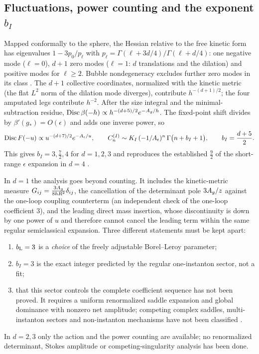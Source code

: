\subsection{\texorpdfstring{Fluctuations, power counting and the exponent $b_I$}{Fluctuations, power counting and the exponent b\_I}}
Mapped conformally to the sphere, the Hessian relative to the free kinetic form has
eigenvalues $1-3p_0/p_\ell$ with $p_\ell=\Gamma(\ell+3d/4)/\Gamma(\ell+d/4)$: one
negative mode ($\ell=0$), $d+1$ zero modes ($\ell=1$: $d$ translations and the dilation)
and positive modes for $\ell\ge2$. Bubble nondegeneracy excludes further zero modes in
its class \cite{rs:Davila2013}. The $d+1$ collective coordinates, normalized with the
kinetic metric (the flat $L^2$ norm of the dilation mode diverges), contribute
$h^{-(d+1)/2}$; the four amputated legs contribute $h^{-2}$. After the size integral and
the minimal-subtraction residue, $\operatorname{Disc}\beta(-h)\propto h^{-(d+5)/2}e^{-A_g/h}$. The
fixed-point shift divides by $\beta'(g_*)=O(\epsilon)$ and adds one inverse power, so
\begin{equation}
 \operatorname{Disc} F(-u)\propto u^{-(d+7)/2}e^{-A_\epsilon/u},\qquad
 C_n^{(I)}\sim K_I\,(-1/A_\epsilon)^n\,\Gamma\bigl(n+b_I+1\bigr),\qquad
 b_I=\frac{d+5}{2}.
 \label{rs:eq:bI}
\end{equation}
This gives $b_I=3,\frac72,4$ for $d=1,2,3$ and reproduces the established $\frac92$ of the
short-range $\epsilon$ expansion in $d=4$ \cite{rs:McKane:2018ocs,rs:Kompaniets:2017yct}.

In $d=1$ the analysis goes beyond counting. It includes the kinetic-metric measure
$G_{ij}=\frac{3A_g}{8hR^2}\delta_{ij}$, the cancellation of the determinant pole
$3A_g/z$ against the one-loop coupling counterterm (an independent check of the one-loop
coefficient $3$), and the leading direct mass insertion, whose discontinuity is down by
one power of $u$ and therefore cannot cancel the leading term within the same regular
semiclassical expansion. Three different statements must be kept apart:
\begin{enumerate}
\item $b_{\mathrm L}=3$ is a \emph{choice} of the freely adjustable Borel--Leroy parameter;
\item $b_I=3$ is the exact integer predicted by the regular one-instanton sector, not a
fit;
\item that this sector controls the complete coefficient sequence has not been proved. It
requires a uniform renormalized saddle expansion and global dominance with nonzero net
amplitude; competing complex saddles, multi-instanton sectors and non-instanton
mechanisms have not been classified \cite{rs:Dunne:2021lie}.
\end{enumerate}
In $d=2,3$ only the action and the power counting are available; no renormalized
determinant, Stokes amplitude or competing-singularity analysis has been done.

